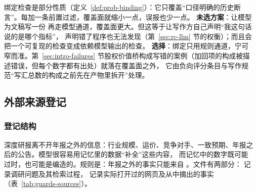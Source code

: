 \begin{tradeoff}[：绑定的覆盖面]
绑定检查是部分性质（定义~\ref{def:prob-binding}）：它只覆盖“口径明确的历史断言”。每加一条前置过滤，覆盖面就缩小一点，误报也少一点。
\textbf{未选方案}：让模型为文稿写一份  再走模型通道，覆盖面更大。但这等于让写作方自己声明“我这句话说的是哪个指标”，
声明错了程序也无法发现（第~\ref{sec:rc-llm} 节的权衡）；而且会把一个可复现的检查变成依赖模型输出的检查。
\textbf{选择}：绑定只用规则通道，宁可窄而准。第~\ref{sec:intro-failures} 节股权价值桥构成写错的案例（加回项的构成被描述错误，但每个数字都有出处）就落在覆盖面之外，
它由负向评分条目与写作规范“写汇总数的构成之前先在产物里拆开”处理。
\end{tradeoff}

\subsection{外部来源登记}
\label{sec:guards-sources}

\subsubsection{登记结构}

深度研报离不开年报之外的信息：行业规模、运价、竞争对手、一致预期、年报之后的公告。模型很容易用记忆里的数据“补全”这些内容，
而记忆中的数字既可能过时，也可能是编造的。规则是：年报之外的事实只能来自 。文件有两部分：
 记录调研问题及其检索过程， 记录实际打开过的网页及从中摘出的事实（表~\ref{tab:guards-sources}）。


